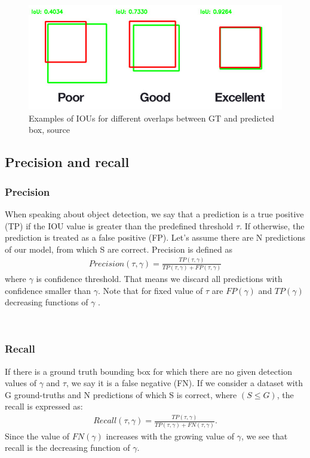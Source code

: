 \begin{figure}
    \includegraphics[width = \linewidth]{images/IOU.jpg}
    \caption{Examples of IOUs for different overlaps between GT and predicted box, source \cite{Cowton2019}}
    \label{fig:iou}
\end{figure}

\subsection{Precision and recall}
\subsubsection{Precision}
\label{subsec:precision}
When speaking about object detection, we say that a prediction is a true positive (TP) if the IOU value is greater than the predefined threshold $\tau$. If otherwise, the prediction is treated as a false positive (FP). Let's assume there are N predictions of our model, from which S are correct. Precision is defined as
\begin{align}
    Precision(\tau, \gamma) = \frac{TP(\tau, \gamma)}{TP(\tau, \gamma) + FP(\tau, \gamma)}
\end{align}
where $\gamma$ is confidence threshold. That means we discard all predictions with confidence smaller than $\gamma$. Note that for fixed value of $\tau$ are $FP(\gamma)$ and $TP(\gamma)$ decreasing functions of $\gamma$ \cite{Padilla2021}.

\

\subsubsection{Recall}
\label{subsec:recall}
If there is a ground truth bounding box for which there are no given detection values of $\gamma$ and $\tau$, we say it is a false negative (FN). If we consider a dataset with G ground-truths and N predictions of which S is correct, where $(S \leq G)$, the recall is expressed as:
\begin{align}
    Recall(\tau, \gamma) = \frac{TP(\tau, \gamma)}{ TP(\tau, \gamma) + FN(\tau, \gamma)}.
\end{align}
Since the value of $FN(\gamma)$ increases with the growing value of $\gamma$, we see that recall is the decreasing function of $\gamma$.

